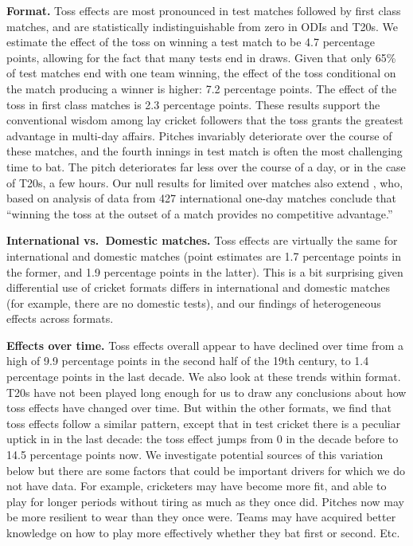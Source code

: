 \documentclass[11pt,  letterpaper]{article}
\begin{document}
\textbf{Format.} Toss effects are most pronounced in test matches followed by first class matches, and are statistically indistinguishable from zero in ODIs and T20s. We estimate the effect of the toss on winning a test match to be 4.7 percentage points, allowing for the fact that many tests end in draws. Given that only 65\% of test matches end with one team winning, the effect of the toss conditional on the match producing a winner is higher: 7.2 percentage points. The effect of the toss in first class matches is 2.3 percentage points. These results support the conventional wisdom among lay cricket followers that the toss grants the greatest advantage in multi-day affairs. Pitches invariably deteriorate over the course of these matches, and the fourth innings in test match is often the most challenging time to bat. The pitch deteriorates far less over the course of a day, or in the case of T20s, a few hours. Our null results for limited over matches also extend \citet{de1998winning}, who, based on analysis of data from 427 international one-day matches conclude that ``winning the toss at the outset of a match provides no competitive advantage.''

\textbf{International vs.~Domestic matches.} Toss effects are virtually the same for international and domestic matches (point estimates are 1.7 percentage points in the former, and 1.9 percentage points in the latter). This is a bit surprising given differential use of cricket formats differs in international and domestic matches (for example, there are no domestic tests), and our findings of heterogeneous effects across formats. 

\textbf{Effects over time.} Toss effects overall appear to have declined over time from a high of 9.9 percentage points in the second half of the 19th century, to 1.4 percentage points in the last decade. We also look at these trends within format. T20s have not been played long enough for us to draw any conclusions about how toss effects have changed over time. But within the other formats, we find that toss effects follow a similar pattern, except that in test cricket there is a peculiar uptick in in the last decade: the toss effect jumps from 0 in the decade before to 14.5 percentage points now.  We investigate potential sources of this variation below  but there are some factors that could be important drivers for which we do not have data. For example, cricketers may have become more fit, and able to play for longer periods without tiring as much as they once did. Pitches now may be more resilient to wear than they once were. Teams may have acquired better knowledge on how to play more effectively whether they bat first or second. Etc.
\end{document}
